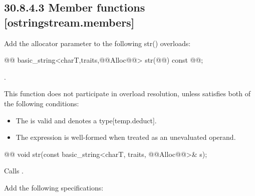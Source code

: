 \documentclass[ebook,11pt,article]{memoir}
\renewcommand{\iref}[1]{[#1]}
\begin{document}
\subsection{30.8.4.3 Member functions [ostringstream.members]}
Add the allocator parameter to the following str() overloads:
\begin{itemdecl}
@@
basic_string<charT,traits,@@Alloc@@> str(@@) const @\added{\&}@;
\end{itemdecl}
\begin{itemdescr}
\pnum
\returns
{}.

\begin{addedblock}
\pnum %
\constraints 
This function does not participate in overload resolution, unless  satisfies both of the following conditions: 

\begin{itemize}
\item The  
is valid and denotes a type\iref{temp.deduct}.

\item The expression 
is well-formed when treated as an unevaluated operand.
\end{itemize}
\end{addedblock}


\end{itemdescr}

\begin{itemdecl}
@@
void str(const basic_string<charT, traits, @@Alloc@@>& s);
\end{itemdecl}

\begin{itemdescr}
\pnum
\effects
Calls
.
\end{itemdescr}


Add the following specifications:
\end{document}
